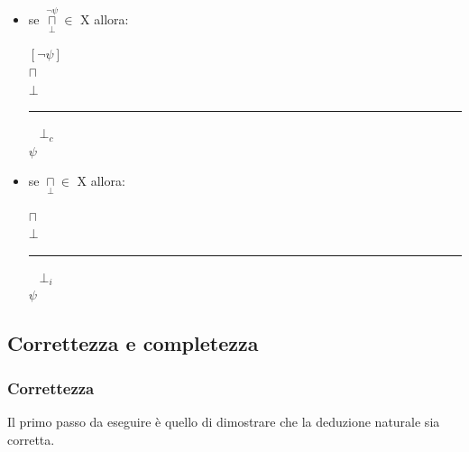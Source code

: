 \documentclass[a4paper, 12pt]{book}
\begin{document}
{\begin{itemize}
    \item se $\overset{\lnot \psi}{\underset{\bot}{\sqcap}} \in$ X allora:
    
    \begin{center}
    \([\lnot \psi]\)\\
    \(\sqcap \)\\
    \(\bot\)\\[-0.5em]
    \hspace{1cm}\rule{2cm}{0.4pt}\(\;\;\; \bot_c\)\\
    \(
    \psi
    \)
    \end{center}

    \item se $\underset{\bot}{\sqcap} \in$ X allora: 
    \begin{center}
    \(\sqcap \)\\
    \(\bot\)\\[-0.5em]
    \hspace{1cm}\rule{2cm}{0.4pt}\(\;\;\; \bot_i\)\\
    \(
    \psi
    \)
    \end{center}
    

    \end{itemize} 

  }

\subsection*{Correttezza e completezza}


\subsubsection*{Correttezza}
Il primo passo da eseguire è quello di dimostrare che la deduzione naturale sia corretta.
\end{document}
